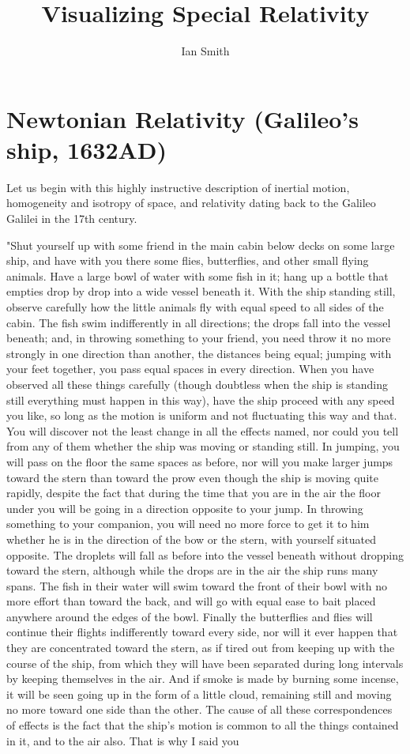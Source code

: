 \documentclass[11pt]{article}
\title{\textbf{Visualizing Special Relativity}}
\author{Ian Smith}
\date{}
\begin{document}
\maketitle

\section{Newtonian Relativity (Galileo's ship, 1632AD)}

Let us begin with this highly instructive description of inertial motion, homogeneity and isotropy of space, and relativity dating back to the Galileo Galilei in the 17th century.

"Shut yourself up with some friend in the main cabin below decks on some large ship, and have with you there some flies, butterflies, and other small flying animals. Have a large bowl of water with some fish in it; hang up a bottle that empties drop by drop into a wide vessel beneath it. With the ship standing still, observe carefully how the little animals fly with equal speed to all sides of the cabin. The fish swim indifferently in all directions; the drops fall into the vessel beneath; and, in throwing something to your friend, you need throw it no more strongly in one direction than another, the distances being equal; jumping with your feet together, you pass equal spaces in every direction. When you have observed all these things carefully (though doubtless when the ship is standing still everything must happen in this way), have the ship proceed with any speed you like, so long as the motion is uniform and not fluctuating this way and that. You will discover not the least change in all the effects named, nor could you tell from any of them whether the ship was moving or standing still. In jumping, you will pass on the floor the same spaces as before, nor will you make larger jumps toward the stern than toward the prow even though the ship is moving quite rapidly, despite the fact that during the time that you are in the air the floor under you will be going in a direction opposite to your jump. In throwing something to your companion, you will need no more force to get it to him whether he is in the direction of the bow or the stern, with yourself situated opposite. The droplets will fall as before into the vessel beneath without dropping toward the stern, although while the drops are in the air the ship runs many spans. The fish in their water will swim toward the front of their bowl with no more effort than toward the back, and will go with equal ease to bait placed anywhere around the edges of the bowl. Finally the butterflies and flies will continue their flights indifferently toward every side, nor will it ever happen that they are concentrated toward the stern, as if tired out from keeping up with the course of the ship, from which they will have been separated during long intervals by keeping themselves in the air. And if smoke is made by burning some incense, it will be seen going up in the form of a little cloud, remaining still and moving no more toward one side than the other. The cause of all these correspondences of effects is the fact that the ship's motion is common to all the things contained in it, and to the air also. That is why I said you 
\end{document}
